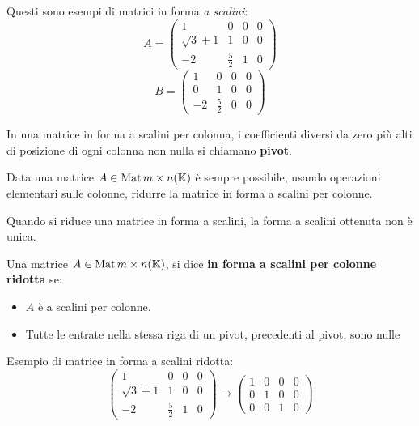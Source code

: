 \begin{example}
	Questi sono esempi di matrici in forma \emph{a scalini}:
	\[
		A = \begin{pmatrix}
			1            & 0           & 0 & 0 \\
			\sqrt{3} + 1 & 1           & 0 & 0 \\
			-2           & \frac{5}{2} & 1 & 0
		\end{pmatrix}
	\]
	\[
		B = \begin{pmatrix}
			1  & 0           & 0 & 0 \\
			0  & 1           & 0 & 0 \\
			-2 & \frac{5}{2} & 0 & 0
		\end{pmatrix}
	\]
\end{example}

\begin{definition}
	In una matrice in forma a scalini per colonna, i coefficienti diversi
	da zero più alti di posizione di ogni colonna non nulla si
	chiamano \textbf{pivot}.
\end{definition}

\begin{theorem}
	Data una matrice $A \in \operatorname{Mat}{m \times n}(\mathbb{K})$ è sempre
	possibile, usando operazioni elementari sulle colonne, ridurre la
	matrice in forma a scalini per colonne.
\end{theorem}

\begin{observation}
	Quando si riduce una matrice in forma a scalini, la forma a scalini
	ottenuta non è unica.
\end{observation}

\begin{definition}
	Una matrice $A \in \operatorname{Mat}{m \times n}(\mathbb{K})$, si dice \textbf{in forma a
		scalini per colonne ridotta} se:
	\begin{itemize}
		\item $A$ è a scalini per colonne.
		\item Tutte le entrate nella stessa riga di un pivot, precedenti al pivot,
		      sono nulle
	\end{itemize}
\end{definition}

\begin{example}
	Esempio di matrice in forma a scalini ridotta:
	\[
		\begin{pmatrix}
			1            & 0           & 0 & 0 \\
			\sqrt{3} + 1 & 1           & 0 & 0 \\
			-2           & \frac{5}{2} & 1 & 0
		\end{pmatrix} \rightarrow
		\begin{pmatrix}
			1 & 0 & 0 & 0 \\
			0 & 1 & 0 & 0 \\
			0 & 0 & 1 & 0
		\end{pmatrix}
	\]
\end{example}

